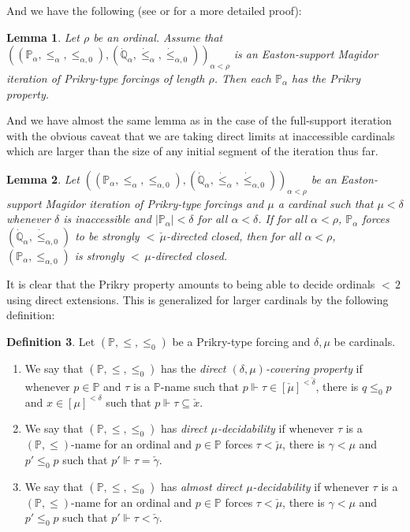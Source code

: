 \documentclass[a4paper]{amsart}
\theoremstyle{definition}
\newtheorem{mydef}{Definition}[section]
\theoremstyle{remark}
\theoremstyle{plain}
\newtheorem{mylem}[mydef]{Lemma}
\numberwithin{mydef}{section}
\newcommand{\dP}{\mathbb{P}}
\newcommand{\dQ}{\mathbb{Q}}
\begin{document}
	And we have the following (see \cite[Section 6.3]{GitikHandbook} or \cite[Lemma 2.4]{JakobLevineFailureApproachability} for a more detailed proof):
	
	\begin{mylem}\label{PrikryIterEaston}
		Let $\rho$ be an ordinal. Assume that $((\dP_{\alpha},\leq_{\alpha},\leq_{\alpha,0}),(\dot{\dQ}_{\alpha},\dot{\leq}_{\alpha},\dot{\leq}_{\alpha,0}))_{\alpha<\rho}$ is an Easton-support Magidor iteration of Prikry-type forcings of length $\rho$. Then each $\dP_{\alpha}$ has the Prikry property.
	\end{mylem}
	
	And we have almost the same lemma as in the case of the full-support iteration with the obvious caveat that we are taking direct limits at inaccessible cardinals which are larger than the size of any initial segment of the iteration thus far.
	
	\begin{mylem}\label{DirectClosureEaston}
		Let $((\dP_{\alpha},\leq_{\alpha},\leq_{\alpha,0}),(\dot{\dQ}_{\alpha},\dot{\leq}_{\alpha},\dot{\leq}_{\alpha,0}))_{\alpha<\rho}$ be an Easton-support Magidor iteration of Prikry-type forcings and $\mu$ a cardinal such that $\mu<\delta$ whenever $\delta$ is inaccessible and $|\dP_{\alpha}|<\delta$ for all $\alpha<\delta$. If for all $\alpha<\rho$, $\dP_{\alpha}$ forces $(\dot{\dQ}_{\alpha},\dot{\leq}_{\alpha,0})$ to be strongly ${<}\,\check{\mu}$-directed closed, then for all $\alpha<\rho$, $(\dP_{\alpha},\leq_{\alpha,0})$ is strongly ${<}\,\mu$-directed closed.
	\end{mylem}
	
	It is clear that the Prikry property amounts to being able to decide ordinals ${<}\,2$ using direct extensions. This is generalized for larger cardinals by the following definition:
	
	\begin{mydef}
		Let $(\dP,\leq,\leq_0)$ be a Prikry-type forcing and $\delta,\mu$ be cardinals.
		\begin{enumerate}
			\item We say that $(\dP,\leq,\leq_0)$ has the \emph{direct $(\delta,\mu)$-covering property} if whenever $p\in\dP$ and $\tau$ is a $\dP$-name such that $p\Vdash\tau\in[\check{\mu}]^{<\check{\delta}}$, there is $q\leq_0p$ and $x\in[\mu]^{<\delta}$ such that $p\Vdash\tau\subseteq\check{x}$.
			\item We say that $(\dP,\leq,\leq_0)$ has \emph{direct $\mu$-decidability} if whenever $\tau$ is a $(\dP,\leq)$-name for an ordinal and $p\in\dP$ forces $\tau<\check{\mu}$, there is $\gamma<\mu$ and $p'\leq_0p$ such that $p'\Vdash\tau=\check{\gamma}$.
			\item We say that $(\dP,\leq,\leq_0)$ has \emph{almost direct $\mu$-decidability} if whenever $\tau$ is a $(\dP,\leq)$-name for an ordinal and $p\in\dP$ forces $\tau<\check{\mu}$, there is $\gamma<\mu$ and $p'\leq_0p$ such that $p'\Vdash\tau<\check{\gamma}$.
		\end{enumerate}
	\end{mydef}
	
\end{document}
